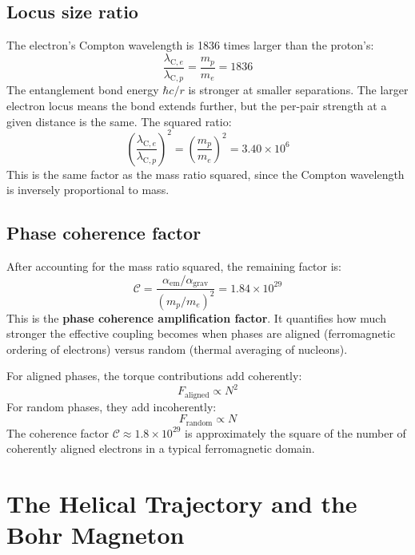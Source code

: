 \documentclass[11pt,letterpaper]{article}
\newcommand{\lambdacp}{\lambda_{\mathrm{C},p}}
\newcommand{\lambdace}{\lambda_{\mathrm{C},e}}
\begin{document}
\subsection{Locus size ratio}

The electron's Compton wavelength is 1836 times larger than the proton's:
\begin{equation}
  \frac{\lambdace}{\lambdacp} = \frac{m_p}{m_e} = 1836
  \label{eq:locus_ratio}
\end{equation}
The entanglement bond energy $\hbar c/r$ is stronger at smaller separations.
The larger electron locus means the bond extends further, but the per-pair
strength at a given distance is the same. The squared ratio:
\begin{equation}
  \left(\frac{\lambdace}{\lambdacp}\right)^2
  = \left(\frac{m_p}{m_e}\right)^2 = 3.40 \times 10^6
  \label{eq:locus_ratio_sq}
\end{equation}
This is the same factor as the mass ratio squared, since the Compton wavelength
is inversely proportional to mass.

\subsection{Phase coherence factor}

After accounting for the mass ratio squared, the remaining factor is:
\begin{equation}
  \mathcal{C}
  = \frac{\alpha_{\mathrm{em}}/\alpha_{\mathrm{grav}}}{(m_p/m_e)^2}
  = 1.84 \times 10^{29}
  \label{eq:coherence}
\end{equation}
This is the \textbf{phase coherence amplification factor}. It quantifies how much
stronger the effective coupling becomes when phases are aligned (ferromagnetic
ordering of electrons) versus random (thermal averaging of nucleons).

For aligned phases, the torque contributions add coherently:
\begin{equation}
  F_{\mathrm{aligned}} \propto N^2
  \label{eq:coherent}
\end{equation}
For random phases, they add incoherently:
\begin{equation}
  F_{\mathrm{random}} \propto N
  \label{eq:incoherent}
\end{equation}
The coherence factor $\mathcal{C} \approx 1.8 \times 10^{29}$ is approximately
the square of the number of coherently aligned electrons in a typical
ferromagnetic domain.

\section{The Helical Trajectory and the Bohr Magneton}
\end{document}
